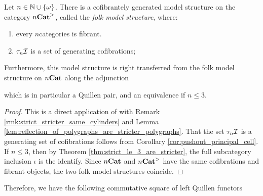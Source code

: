 \begin{thm} \label{thm:folk_model_structure_on_stricter_n}
    Let \( n \in \mathbb{N} \cup \left\{ {\omega} \right\} \).
    There is a cofibrantely generated model structure on the category \( {n\mathbf{Cat}}^> \), called the \emph{folk model structure}, where:
    \begin{enumerate}
        \item every \( n \)\nbd categories is fibrant.
        \item \( \tau_{n}\mathcal{I} \) is a set of generating cofibrations;
    \end{enumerate}
    Furthermore, this model structure is right transferred from the folk model structure on \( {n\mathbf{Cat}} \) along the adjunction 
    \begin{center}
    \end{center}
    which is in particular a Quillen pair, and an equivalence if \( n \le 3 \).
\end{thm}
\begin{proof}
    This is a direct application of \cite[Proposition 21.3.2]{ara2025polygraphs} with Remark \ref{rmk:strict_stricter_same_cylinders} and Lemma \ref{lem:reflection_of_polygraphs_are_stricter_polygraphs}.
    That the set \( \tau_{n}\mathcal{I} \) is a generating set of cofibrations follows from Corollary \ref{cor:pushout_principal_cell}.
    If \( n \le 3 \), then by Theorem \ref{thm:strict_le_3_are_stricter}, the full subcategory inclusion \( \iota \) is the identify.
    Since \( {n\mathbf{Cat}} \) and \( {n\mathbf{Cat}}^> \) have the same cofibrations and fibrant objects, the two folk model structures coincide. 
\end{proof}

\noindent Therefore, we have the following commutative square of left Quillen functors
\begin{center}
\end{center}


